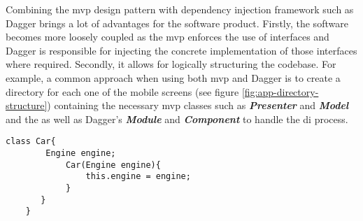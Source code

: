        
    Combining the \gls{mvp} design pattern with dependency injection framework such as Dagger brings a lot of advantages for the software product. Firstly, the software becomes more loosely coupled as the \gls{mvp} enforces the use of interfaces and Dagger is responsible for injecting the concrete implementation of those interfaces where required. Secondly, it allows for logically structuring the codebase. For example, a common approach when using both \gls{mvp} and Dagger is to create a directory for each one of the mobile screens (see figure \ref{fig:app-directory-structure}) containing the necessary \gls{mvp} classes such as \textit{\textbf{Presenter}} and \textit{\textbf{Model}} and the as well as Dagger's \textit{\textbf{Module}} and \textit{\textbf{Component}} to handle the \gls{di} process.
    
    \begin{lstlisting}[caption= DI example, label=di-car-example,frame=tlrbr,basicstyle=\small,captionpos=b]
    class Car{
        Engine engine;
            Car(Engine engine){
                this.engine = engine;
            }
       }
    }
\end{lstlisting}
